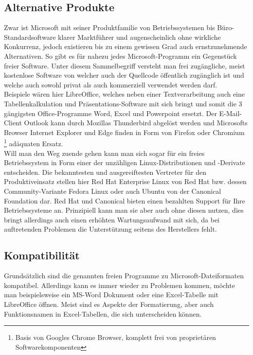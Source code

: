 \subsection{Alternative Produkte}
Zwar ist Microsoft mit seiner Produktfamilie von Betriebssystemen bis Büro-Standardsoftware klarer Marktführer und augenscheinlich ohne wirkliche Konkurrenz, jedoch existieren bis zu einem gewissen Grad auch ernstzunehmende Alternativen. So gibt es für nahezu jedes Microsoft-Programm ein Gegenstück freier Software. Unter diesem Sammelbegriff versteht man frei zugängliche, meist kostenlose Software von welcher auch der Quellcode öffentlich zugänglich ist und welche auch sowohl privat als auch kommerziell verwendet werden darf.\\
Beispiele wären hier \glqq LibreOffice\grqq{}, welches neben einer Textverarbeitung auch eine Tabellenkalkulation und Präsentations-Software mit sich bringt und somit die 3 gängigsten Office-Programme \glqq Word\grqq{}, \glqq Excel\grqq{} und \glqq Powerpoint \grqq{} ersetzt. Der E-Mail-Client \glqq Outlook\grqq{} kann durch Mozillas \glqq Thunderbird\grqq{} abgelöst werden und Microsofts Browser \glqq Internet Explorer\grqq{} und \glqq Edge\grqq{} finden in Form von \glqq Firefox\grqq{} oder \glqq Chromium\grqq{} \footnote{Basis von Googles Chrome Browser, komplett frei von proprietären Softwarekomponenten} adäquaten Ersatz.\\
Will man den Weg zuende gehen kann man sich sogar für ein freies Betriebssystem in Form einer der unzähligen Linux-Distributionen und -Derivate entscheiden. Die bekanntesten und ausgereiftesten Vertreter für den Produktiveinsatz stellen hier \glqq Red Hat Enterprise Linux\grqq{} von Red Hat bzw. dessen Community-Variante \glqq Fedora Linux\grqq{} oder auch \glqq Ubuntu\grqq{} von der Canonical Foundation dar. Red Hat und Canonical bieten einen bezahlten Support für Ihre Betriebssysteme an. Prinzipiell kann man sie aber auch ohne diesen nutzen, dies bringt allerdings auch einen erhöhten Wartungsaufwand mit sich, da bei auftretenden Problemen die Unterstützung seitens des Herstellers fehlt.

\subsection{Kompatibilität}
Grundsätzlich sind die genannten freien Programme zu Microsoft-Dateiformaten kompatibel. Allerdings kann es immer wieder zu Problemen kommen, möchte man beispielsweise ein MS-Word Dokument oder eine Excel-Tabelle mit LibreOffice öffnen. Meist sind es Aspekte der Formatierung, aber auch Funktionsnamen in Excel-Tabellen, die sich unterscheiden können.

